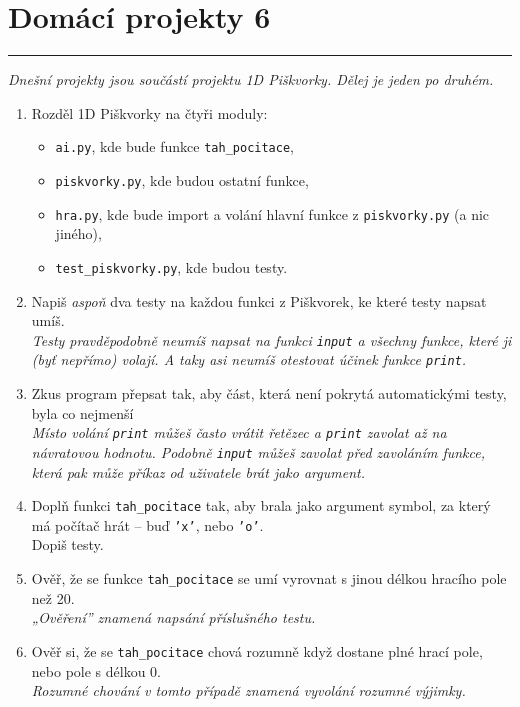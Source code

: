 \documentclass[a4paper,10pt]{article}
\newcommand\plsetno{6}
\newcommand\startsection[1]{
     \vspace{0.2ex}
    \hrule
    {\fontspec{Oxygen} \tiny
     \vspace{-1ex}
     \emph{#1}
     \vspace{-1.5em}
    }
}
\begin{document}
\section*{Domácí projekty \plsetno}

\startsection{Dnešní projekty jsou součástí projektu 1D Piškvorky. Dělej je jeden po druhém.}

\begin{enumerate}
\item Rozděl 1D Piškvorky na čtyři moduly:
    \begin{itemize}
        \item \texttt{ai.py}, kde bude funkce \texttt{tah\_pocitace},
        \item \texttt{piskvorky.py}, kde budou ostatní funkce,
        \item \texttt{hra.py}, kde bude import a volání hlavní funkce z \texttt{piskvorky.py} (a nic jiného),
        \item \texttt{test\_piskvorky.py}, kde budou testy.
    \end{itemize}

\item Napiš \emph{aspoň} dva testy na každou funkci z Piškvorek, ke které testy napsat umíš.
    \\\emph{\small Testy pravděpodobně neumíš napsat na funkci \texttt{input} a všechny funkce, které ji (byť nepřímo) volají.
            A taky asi neumíš otestovat účinek funkce \texttt{print}.}

\item Zkus program přepsat tak, aby část, která není pokrytá automatickými testy, byla co nejmenší
    \\\emph{\small Místo volání \texttt{print} můžeš často vrátit řetězec
            a \texttt{print} zavolat až na návratovou hodnotu.
            Podobně \texttt{input} můžeš zavolat před zavoláním funkce,
            která pak může příkaz od uživatele brát jako argument.}

\item Doplň funkci \texttt{tah\_pocitace} tak, aby brala jako argument symbol, za který má počítač hrát – buď \texttt{'x'}, nebo \texttt{'o'}.
    \\Dopiš testy.

\item Ověř, že se funkce \texttt{tah\_pocitace} se umí vyrovnat s jinou délkou hracího pole než 20.
    \\\emph{\small „Ověření” znamená napsání příslušného testu.}

\item Ověř si, že se \texttt{tah\_pocitace} chová rozumně když dostane plné hrací pole, nebo pole s délkou 0.
    \\\emph{\small Rozumné chování v tomto případě znamená vyvolání rozumné výjimky.}

\end{enumerate}
\end{document}
